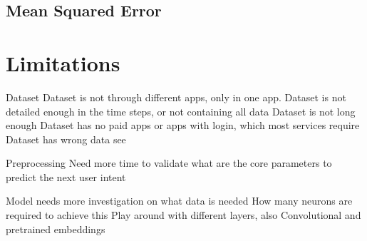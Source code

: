\subsection{Mean Squared Error}

\section{Limitations}

Dataset
Dataset is not through different apps, only in one app.
Dataset is not detailed enough in the time steps, or not containing all data
Dataset is not long enough
Dataset has no paid apps or apps with login, which most services require
Dataset has wrong data see \cite{clay}

Preprocessing
Need more time to validate what are the core parameters to predict the next user intent


Model needs more investigation on what data is needed
How many neurons are required to achieve this
Play around with different layers, also Convolutional and pretrained embeddings


